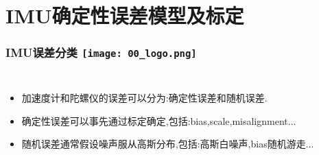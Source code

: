 \section{IMU确定性误差模型及标定}

\begin{comment}
\end{comment}
\begin{frame}
\frametitle{IMU误差分类 \hfill \texttt{[image: 00\_logo.png]}}
\begin{columns}
  
	\begin{itemize}
		\item 加速度计和陀螺仪的误差可以分为:{\color{red}确定性误差}和{\color{red}随机误差}.
		\item 确定性误差可以事先通过标定确定,包括:bias,scale,misalignment...
		\item 随机误差通常假设噪声服从高斯分布,包括:高斯白噪声,bias随机游走...
  \end{itemize}
  
  

\end{columns}
\end{frame}


